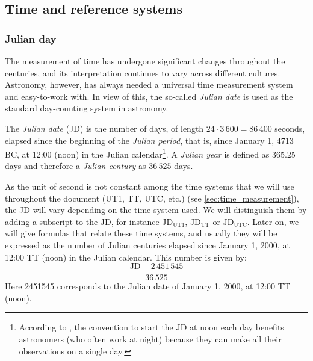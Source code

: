 \documentclass[../main.tex]{subfiles}
\begin{document}
\subsection{Time and reference systems}
\subsubsection{Julian day}\label{sec:julian_day}
The measurement of time has undergone significant changes throughout the centuries, and its interpretation continues to vary across different cultures. Astronomy, however, has always needed a universal time measurement system and easy-to-work with. In view of this, the so-called \emph{Julian date} is used as the standard day-counting system in astronomy.
\begin{definition}
  The \emph{Julian date} (JD) is the number of days, of length $24\cdot3\,600 = 86\,400$ seconds, elapsed since the beginning of the \emph{Julian period}, that is, since January 1, 4713 BC, at 12:00 (noon) in the Julian calendar\footnote{According to \cite{vallado}, the convention to start the JD at noon each day benefits astronomers (who often work at night) because they can make all their observations on a single day.}. A \emph{Julian year} is defined as 365.25 days and therefore a \emph{Julian century} as $36\,525$ days.
\end{definition}
As the unit of second is not constant among the time systems that we will use throughout the document (UT1, TT, UTC, etc.) (see \cref{sec:time_measurement}), the JD will vary depending on the time system used. We will distinguish them by adding a subscript to the JD, for instance $\text{JD}_\mathrm{UT1}$, $\text{JD}_\mathrm{TT}$ or $\text{JD}_\mathrm{UTC}$. Later on, we will give formulas that relate these time systems, and usually they will be expressed as the number of Julian centuries elapsed since January 1, 2000, at 12:00 TT (noon) in the Julian calendar. This number is given by:
\begin{equation}
  \frac{\text{JD}-2\,451\,545}{36\,525}
\end{equation}
Here 2451545 corresponds to the Julian date of January 1, 2000, at 12:00 TT (noon).
\end{document}
